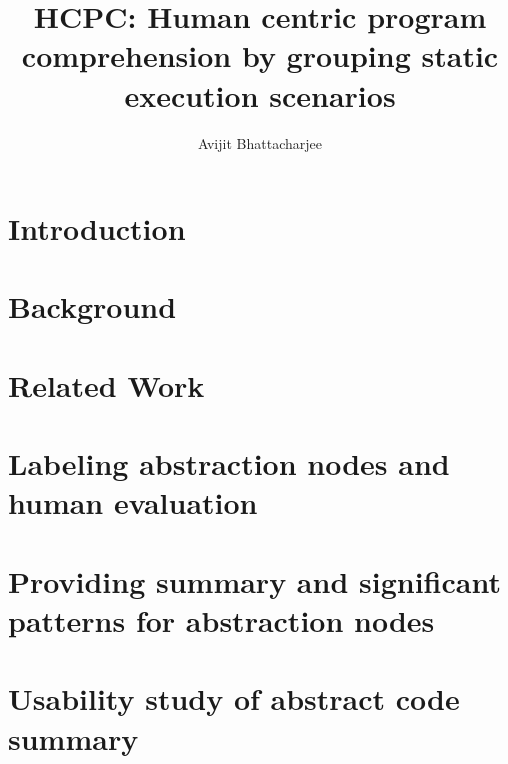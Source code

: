 \documentclass{uofsthesis-cs}
\title{HCPC: Human centric program comprehension by grouping static execution scenarios}
\author{Avijit Bhattacharjee}
\begin{document}
\maketitle

\frontmatter


\chapter{Introduction}




%
% 
% 
%


\chapter{Background}


\chapter{Related Work}


\chapter{ Labeling abstraction nodes and human evaluation}


\chapter{ Providing summary and significant patterns for abstraction nodes}


\chapter{Usability study of abstract code summary}

\end{document}
